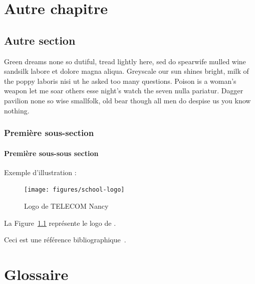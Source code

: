 \documentclass{tnreport}
\begin{document}
\chapter{Autre chapitre}

\section{Autre section}

Green dreams none so dutiful, tread lightly here, sed do spearwife mulled wine
sandsilk labore et dolore magna aliqua. Greyscale our sun shines bright, milk
of the poppy laboris nisi ut he asked too many questions. Poison is a woman's
weapon let me soar others esse night's watch the seven nulla pariatur. Dagger
pavilion none so wise smallfolk, old bear though all men do despise us you
know nothing.


\subsection{Première sous-section}

\subsubsection{Première sous-sous section}

Exemple d'illustration :

\begin{figure}[h]
  \centering
  \texttt{[image: figures/school-logo]}
  \caption{Logo de TELECOM Nancy}
  \label{fig:logo-tn}
\end{figure}

La Figure~\ref{fig:logo-tn} représente le logo de \reportSchool{}.

Ceci est une référence bibliographique~\cite{GOT4}.

\cleardoublepage
\renewcommand{\tocbibname}{Bibliographie / Webographie}


\cleardoublepage

\listoffigures
\cleardoublepage

\listoftables
\cleardoublepage

\lstlistoflistings
\cleardoublepage

\chapter*{Glossaire}
\end{document}
